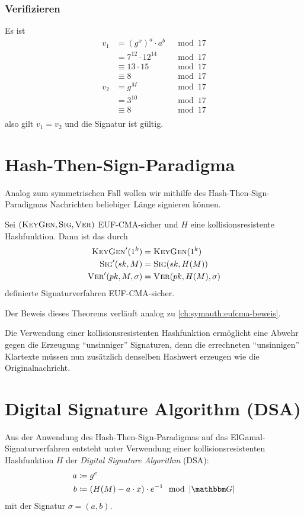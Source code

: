 \subsubsection*{Verifizieren} Es ist
\begin{align*} 
  v_1 & = (g^x)^a \cdot a^b & \mod 17 \\
      & = 7^{12} \cdot 12^{14} & \mod 17 \\ 
      & \equiv 13 \cdot 15 & \mod 17 \\
      & \equiv 8 & \mod 17 \\
  v_2 & = g^M & \mod 17 \\ 
      &= 3^{10} & \mod 17\\ 
      &\equiv 8 & \mod 17\\
\end{align*} 
also gilt $v_1=v_2$ und die Signatur ist gültig.
\section{Hash-Then-Sign-Paradigma}\indexHashSign 
Analog zum symmetrischen Fall wollen wir mithilfe des
Hash-Then-Sign-Paradigmas Nachrichten beliebiger Länge signieren können.
\begin{theorem} Sei $(\textsc{KeyGen}, \textsc{Sig},
  \textsc{Ver})$ EUF-CMA-sicher und $H$ eine kollisionsresistente
  Hashfunktion. Dann ist das durch
  \begin{align*} 
    \textsc{KeyGen}'(1^k) &= \textsc{KeyGen}(1^k)\\
    \textsc{Sig}'(sk,M) &= \textsc{Sig}(sk,H(M))\\
    \textsc{Ver}'(pk,M,\sigma) &= \textsc{Ver}(pk,H(M),\sigma)
  \end{align*} definierte Signaturverfahren EUF-CMA-sicher.
\end{theorem}

Der Beweis dieses Theorems verläuft analog zu
\ref{ch:symauth:eufcma-beweis}.

Die Verwendung einer kollisionsresistenten Hashfunktion ermöglicht
eine Abwehr gegen die Erzeugung "`unsinniger"' Signaturen, denn die
errechneten "`unsinnigen"' Klartexte müssen nun zusätzlich denselben
Hashwert erzeugen wie die Originalnachricht.


\section{Digital Signature Algorithm (DSA)} 
\indexDSA Aus der Anwendung des Hash-Then-Sign-Paradigmas auf das
ElGamal-Signaturverfahren entsteht unter Verwendung einer
kollisionsresistenten Hashfunktion $H$ der
\emph{Digital Signature Algorithm} (DSA):
\begin{align*} 
  a &\coloneqq g^e\\ 
  b &\coloneqq (H(M) - a \cdot x) \cdot e^{-1} \mod \left|\G\right|
\end{align*} 
mit der Signatur $\sigma = (a,b)$.

